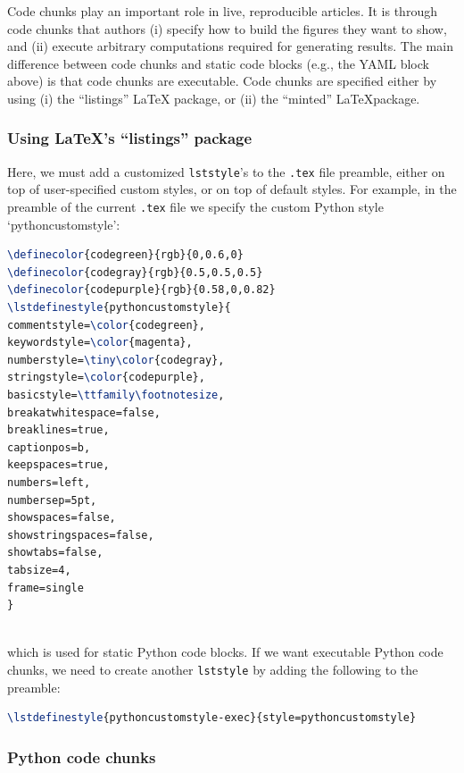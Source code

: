 \documentclass[12pt]{article}
\begin{document}
Code chunks play an important role in live, reproducible articles.
It is through code chunks that authors (i) specify how to build the
figures they want to show, and (ii) execute arbitrary computations
required for generating results.
The main difference between code chunks and static code blocks (e.g.,
the YAML block above) is that code chunks are executable.
Code chunks are specified either by using (i) the ``listings'' \LaTeX
package, or (ii) the ``minted'' \LaTeX package.

\subsubsection*{Using \LaTeX 's ``listings'' package}

Here, we must add a customized \texttt{lststyle}'s to the
\texttt{.tex} file preamble, either on top of user-specified custom
styles, or on top of default styles.
For example, in the preamble of the current \texttt{.tex} file we
specify the custom Python style `pythoncustomstyle':\\

\begin{lstlisting}[language=tex, frame=single]
\definecolor{codegreen}{rgb}{0,0.6,0}
\definecolor{codegray}{rgb}{0.5,0.5,0.5}
\definecolor{codepurple}{rgb}{0.58,0,0.82}
\lstdefinestyle{pythoncustomstyle}{  
commentstyle=\color{codegreen},
keywordstyle=\color{magenta},
numberstyle=\tiny\color{codegray},
stringstyle=\color{codepurple},
basicstyle=\ttfamily\footnotesize,
breakatwhitespace=false,         
breaklines=true,                 
captionpos=b,                    
keepspaces=true,                 
numbers=left,                    
numbersep=5pt,                  
showspaces=false,                
showstringspaces=false,
showtabs=false,                  
tabsize=4,
frame=single
}
\end{lstlisting}

\noindent \\which is used for static Python code blocks.
If we want executable Python code chunks, we need to create another
\texttt{lststyle} by adding the following to the preamble:\\

\begin{lstlisting}[language=tex, frame=single, breaklines=true]
\lstdefinestyle{pythoncustomstyle-exec}{style=pythoncustomstyle}
\end{lstlisting}

\subsubsection*{Python code chunks}
\end{document}
